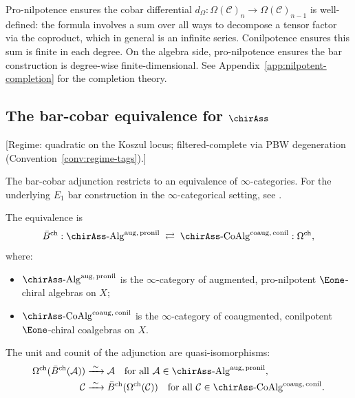 \begin{remark}\label{rem:convergence-pro-nil}
\label{rem:convergence-pronilpotent}
Pro-nilpotence ensures the cobar differential
$d_\Omega: \Omega(\mathcal{C})_n \to \Omega(\mathcal{C})_{n-1}$
is well-defined: the formula involves a sum over all ways to
decompose a tensor factor via the coproduct, which in general is an
infinite series.  Conilpotence ensures this sum is finite in each
degree.  On the algebra side, pro-nilpotence ensures the bar
construction is degree-wise finite-dimensional.
See Appendix~\ref{app:nilpotent-completion} for the completion
theory.
\end{remark}

\subsection{\texorpdfstring{The bar-cobar equivalence for $\chirAss$}{The bar-cobar equivalence for Ass ch}}

\begin{theorem}
\label{thm:e1-chiral-koszul-duality}
\textup{[Regime: quadratic on the Koszul locus;
filtered-complete via PBW degeneration
\textup{(}Convention~\textup{\ref{conv:regime-tags})}.]}

The bar-cobar adjunction restricts to an equivalence of
$\infty$-categories.  For the underlying $E_1$ bar construction in the
$\infty$-categorical setting, see \cite[§5.2.2]{HA}.

The equivalence
is
\[
\bar{B}^{\mathrm{ch}}:
\chirAss\text{-}\mathrm{Alg}^{\mathrm{aug,\, pronil}}
\;\rightleftarrows\;
\chirAss\text{-}\mathrm{CoAlg}^{\mathrm{coaug,\, conil}}
:\Omega^{\mathrm{ch}},
\]
where:
\begin{itemize}
\item $\chirAss\text{-}\mathrm{Alg}^{\mathrm{aug,\, pronil}}$
   is the $\infty$-category of augmented, pro-nilpotent
   $\Eone$-chiral algebras on $X$;
\item $\chirAss\text{-}\mathrm{CoAlg}^{\mathrm{coaug,\, conil}}$
   is the $\infty$-category of coaugmented, conilpotent
   $\Eone$-chiral coalgebras on $X$.
\end{itemize}

The unit and counit of the adjunction are quasi-isomorphisms:
\begin{align}
\Omega^{\mathrm{ch}}(\bar{B}^{\mathrm{ch}}(\mathcal{A}))
&\xrightarrow{\;\sim\;} \mathcal{A}
\quad \text{for all } \mathcal{A} \in
\chirAss\text{-}\mathrm{Alg}^{\mathrm{aug,\, pronil}},
\label{eq:e1-counit} \\
\mathcal{C}
&\xrightarrow{\;\sim\;}
\bar{B}^{\mathrm{ch}}(\Omega^{\mathrm{ch}}(\mathcal{C}))
\quad \text{for all } \mathcal{C} \in
\chirAss\text{-}\mathrm{CoAlg}^{\mathrm{coaug,\, conil}}.
\label{eq:e1-unit}
\end{align}
\end{theorem}

